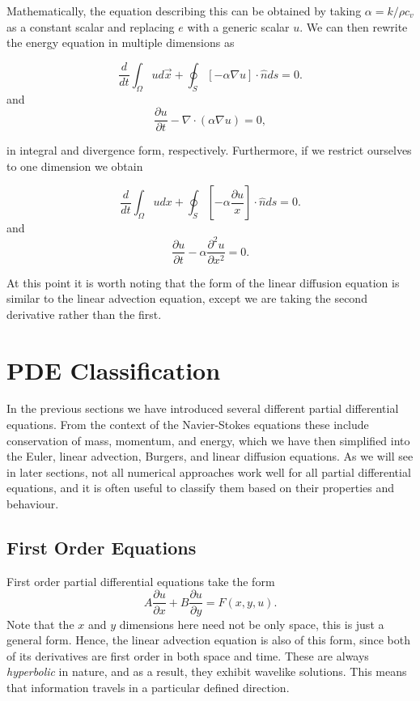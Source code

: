 Mathematically, the equation describing this can be obtained by taking $\alpha = k/{\rho c_v}$ as a constant scalar and replacing $e$ with a generic scalar $u$. We can then rewrite the energy equation in multiple dimensions as
\begin{eqBox}
\begin{equation}
\frac{d}{dt}\int_\Omega u d\vec{x} + \oint_S \left[ - \alpha \nabla u \right] \cdot \hat{n} ds = 0.
\end{equation}
and
\begin{equation}
\frac{\partial u}{\partial t} - \nabla \cdot (\alpha \nabla u) = 0,
\end{equation}
\end{eqBox}
in integral and divergence form, respectively. Furthermore, if we restrict ourselves to one dimension we obtain
\begin{eqBox}
\begin{equation}
\frac{d}{dt}\int_\Omega u dx + \oint_S \left[ - \alpha  \frac{\partial u}{x} \right] \cdot \hat{n} ds = 0.
\end{equation}
and
\begin{equation}
\frac{\partial u}{\partial t} - \alpha \frac{\partial^2 u}{\partial x^2} = 0.
\end{equation}
\end{eqBox}
At this point it is worth noting that the form of the linear diffusion equation is similar to the linear advection equation, except we are taking the second derivative rather than the first.

\section{PDE Classification}
In the previous sections we have introduced several different partial differential equations. From the context of the Navier-Stokes equations these include conservation of mass, momentum, and energy, which we have then simplified into the Euler, linear advection, Burgers, and linear diffusion equations. As we will see in later sections, not all numerical approaches work well for all partial differential equations, and it is often useful to classify them based on their properties and behaviour.

\subsection{First Order Equations}
First order partial differential equations take the form
\begin{equation}
	A \frac{\partial u}{\partial x} + B \frac{\partial u}{\partial y} = F(x,y,u).
\end{equation}
Note that the $x$ and $y$ dimensions here need not be only space, this is just a general form. Hence, the linear advection equation is also of this form, since both of its derivatives are first order in both space and time. These are always {\it hyperbolic} in nature, and as a result, they exhibit wavelike solutions. This means that information travels in a particular defined direction.


